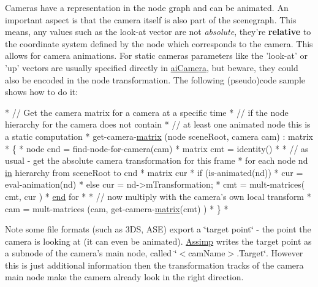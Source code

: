 Cameras have a representation in the node graph and can be animated. An important aspect is that the camera itself is also part of the scenegraph. This means, any values such as the look-\/at vector are not {\itshape absolute}, they're {\bfseries relative} to the coordinate system defined by the node which corresponds to the camera. This allows for camera animations. For static cameras parameters like the 'look-\/at' or 'up' vectors are usually specified directly in \hyperlink{structai_camera}{ai\-Camera}, but beware, they could also be encoded in the node transformation. The following (pseudo)code sample shows how to do it\-: \par
\par
 
\begin{DoxyCode}
* \textcolor{comment}{// Get the camera matrix for a camera at a specific time}
* \textcolor{comment}{// if the node hierarchy for the camera does not contain}
* \textcolor{comment}{// at least one animated node this is a static computation}
* \textcolor{keyword}{get}-camera-\hyperlink{_g_l_e_w_2glew_8h_a7b24a3f2f56eb1244ae69dacb4fecb6f}{matrix} (node sceneRoot, camera cam) : matrix
* \{
*    node   cnd = find-node-\textcolor{keywordflow}{for}-camera(cam)
*    matrix cmt = identity()
*
*    \textcolor{comment}{// as usual - get the absolute camera transformation for this frame}
*    \textcolor{keywordflow}{for each} node nd \hyperlink{_g_l_e_w_2glew_8h_a83ad0ee7f1e06b59c90271716e689080}{in} hierarchy from sceneRoot to cnd
*      matrix cur
*      \textcolor{keywordflow}{if} (is-animated(nd))
*         cur = eval-animation(nd)
*      \textcolor{keywordflow}{else} cur = nd->mTransformation;
*      cmt = mult-matrices( cmt, cur )
*    \hyperlink{_g_l_e_w_2glew_8h_a432111147038972f06e049e18a837002}{end} \textcolor{keywordflow}{for}
*
*    \textcolor{comment}{// now multiply with the camera's own local transform}
*    cam = mult-matrices (cam, \textcolor{keyword}{get}-camera-\hyperlink{_g_l_e_w_2glew_8h_a7b24a3f2f56eb1244ae69dacb4fecb6f}{matrix}(cmt) )
* \}
* 
\end{DoxyCode}


\begin{DoxyNote}{Note}
some file formats (such as 3\-D\-S, A\-S\-E) export a \char`\"{}target point\char`\"{} -\/ the point the camera is looking at (it can even be animated). \hyperlink{namespace_assimp}{Assimp} writes the target point as a subnode of the camera's main node, called \char`\"{}$<$cam\-Name$>$.\-Target\char`\"{}. However this is just additional information then the transformation tracks of the camera main node make the camera already look in the right direction. 
\end{DoxyNote}


